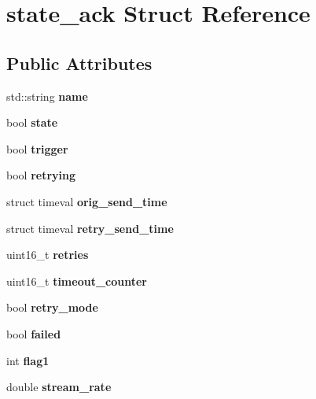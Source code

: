 \hypertarget{structstate__ack}{}\section{state\+\_\+ack Struct Reference}
\label{structstate__ack}
\subsection*{Public Attributes}
\begin{DoxyCompactItemize}
\item 
\mbox{\label{structstate__ack_abf3fc67914bb31ecbcb11cbd0522bfe9}} 
std\+::string {\bfseries name}
\item 
\mbox{\label{structstate__ack_a7219376a758fdf720de30a8e945a5b7a}} 
bool {\bfseries state}
\item 
\mbox{\label{structstate__ack_a64041b901bc541a36b5131c58f0ce122}} 
bool {\bfseries trigger}
\item 
\mbox{\label{structstate__ack_a655f263de5e02dd1e0f415d73b6c418e}} 
bool {\bfseries retrying}
\item 
\mbox{\label{structstate__ack_a94719cb9fb08effe9bf9b2dcfa16b9b3}} 
struct timeval {\bfseries orig\+\_\+send\+\_\+time}
\item 
\mbox{\label{structstate__ack_a914463304f4b54d397c3e6aefa4057fd}} 
struct timeval {\bfseries retry\+\_\+send\+\_\+time}
\item 
\mbox{\label{structstate__ack_a8d8e946f6419f6286116c706874b9fb5}} 
uint16\+\_\+t {\bfseries retries}
\item 
\mbox{\label{structstate__ack_a86798e6d48f3ae9dabd0ff07936adc85}} 
uint16\+\_\+t {\bfseries timeout\+\_\+counter}
\item 
\mbox{\label{structstate__ack_af8db28000672a43d6b100fbc84fb5c00}} 
bool {\bfseries retry\+\_\+mode}
\item 
\mbox{\label{structstate__ack_a9ce3428646bee8b3a243f80aa7f71100}} 
bool {\bfseries failed}
\item 
\mbox{\label{structstate__ack_a8633471af2576bf33d555fc35264995c}} 
int {\bfseries flag1}
\item 
\mbox{\label{structstate__ack_a1dad5ab6686c6df5ae332ab2f9bd66e2}} 
double {\bfseries stream\+\_\+rate}
\end{DoxyCompactItemize}


